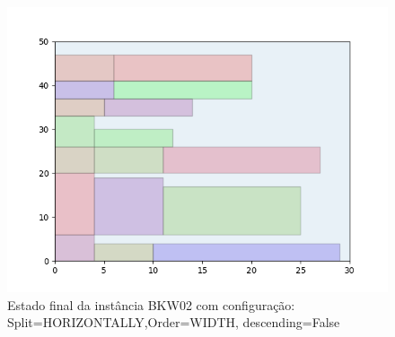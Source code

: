 \begin{figure}[H]
    \centering
    \caption[]{Estado final da instância BKW02 com configuração: Split=HORIZONTALLY,Order=WIDTH, descending=False}
    \label{fig:bkw02-horizontally-width-false}
    \includegraphics[scale=0.5]{output/figures/bkw/bkw02/horizontally/width/false/00}
\end{figure}
